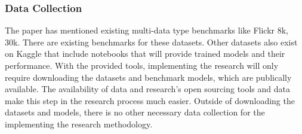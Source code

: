 \subsubsection{Data Collection}

The paper has mentioned existing multi-data type benchmarks like Flickr 8k, 30k.  There are existing benchmarks for these datasets.  Other datasets also exist on Kaggle that include notebooks that will provide trained models and their performance.  With the provided tools, implementing the research will only require downloading the datasets and benchmark models, which are publically available.  The availability of data and research's open sourcing tools and data make this step in the research process much easier.  Outside of downloading the datasets and models, there is no other necessary data collection for the implementing the research methodology.


